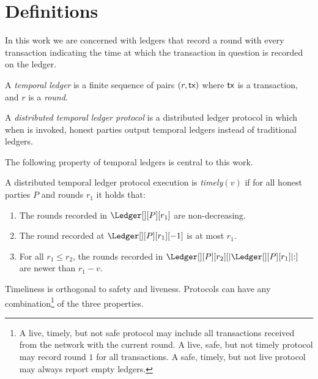 \section{Definitions}\label{sec:defs}

In this work we are concerned with ledgers that
record a round with every transaction indicating the time at which
the transaction in question is recorded on the ledger.

\begin{definition}
  A \emph{temporal ledger} is a finite sequence of pairs $(r, \textsf{tx})$ where $\textsf{tx}$ is
  a transaction, and $r$ is a \emph{round}.
\end{definition}

\begin{definition}
  A \emph{distributed temporal ledger protocol} is a distributed ledger protocol
  in which when \rread is invoked, honest parties output temporal ledgers instead of traditional ledgers.
\end{definition}

The following property of temporal ledgers is central to this work.

\begin{definition}[Timely]\label{def:timely}
  A distributed temporal ledger protocol execution is \emph{timely}$(v)$
  if for all honest parties $P$ and rounds $r_1$ it holds that:

  \begin{enumerate}
    \item The rounds recorded in $\Ledger[][P][r_1]$ are non-decreasing.\label{def:timely-increasing}
    \item The round recorded at $\Ledger[][P][r_1][-1]$ is at most $r_1$.\label{def:timely-past}
    \item For all $r_1 \leq r_2$, the rounds recorded in $\Ledger[][P][r_2][|\Ledger[][P][r_1]|{:}]$ are
          newer than $r_1 - v$.\label{def:timely-chunk}
  \end{enumerate}
\end{definition}

Timeliness is orthogonal to safety and liveness. Protocols can have any
combination\footnote{A live, timely, but not safe protocol may include all transactions
received from the network with the current round.
A live, safe, but not timely protocol may record round $1$ for all transactions.
A safe, timely, but not live protocol may always report empty ledgers.}
of the three properties.


